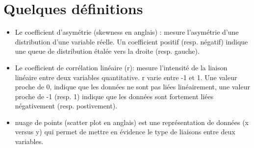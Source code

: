 \documentclass[11pt]{exam}
\begin{document}
 

 \section*{Quelques d\'efinitions}
\begin{itemize}
\item Le coefficient d'asym\'etrie (skewness en anglais) : mesure l'asym\'etrie d'une distribution d'une variable r\'eelle. Un coefficient positif (resp. n\'egatif) indique une queue de distribution \'etal\'ee vers la droite (resp. gauche).


\item Le coefficient de corr\'elation lin\'eaire (r): mesure l'intensit\'e de la liaison lin\'eaire entre deux variables quantitative. r varie entre -1 et 1. Une valeur proche de 0, indique que les donn\'ees ne sont pas li\'ees lin\'eairement, une valeur proche de -1 (resp. 1) indique que les donn\'ees sont fortement li\'ees n\'egativement (resp. postivement).

\item nuage de points (scatter plot en anglais) est une repr\'esentation de donn\'ees (x versus y) qui permet de mettre en \'evidence le type de liaisons entre deux variables.
\end{itemize}
\end{document}

